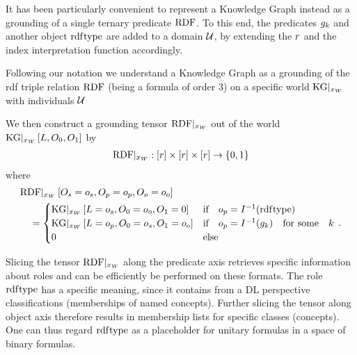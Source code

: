 \label{subsec:knowledgeGraphTernaryRep}

It has been particularly convenient to represent a Knowledge Graph instead as a grounding of a single ternary predicate $\mathrm{RDF}$.
To this end, the predicates $g_{k}$ and another object $\mathrm{rdf}\mathrm{type}$ are added to a domain $\mathcal{U}$, by extending the $r$ and the index interpretation function accordingly.


Following our notation we understand a Knowledge Graph as a grounding of the rdf triple relation $\mathrm{RDF}$ (being a formula of order 3) on a specific world $\mathrm{KG}|_{x_{W}}$ with individuals $\mathcal{U}$

We then construct a grounding tensor ${\mathrm{RDF}}|_{x_{W}}$ out of the world $\mathrm{KG}|_{x_{W}}\left[L,O_{0},O_{1}\right]$ by
\begin{align*}
    {\mathrm{RDF}}|_{x_{W}} : [r] \times [r] \times [r] \rightarrow \{0,1\}
\end{align*}
where
\begin{align*}
    &{\mathrm{RDF}}|_{x_{W}}\left[O_{s}=o_{s}, O_{p}=o_{p}, O_{o}=o_{o}\right] \\
    &\quad =
    \begin{cases}
        \mathrm{KG}|_{x_{W}}\left[L=o_{s},O_{0}=o_{o},O_{1}=0\right]
        & \text{if}\quad o_{p} = I^{-1}(\mathrm{rdf}\mathrm{type}) \\
        \mathrm{KG}|_{x_{W}}\left[L=o_{p},O_{0}=o_{s},O_{1}=o_{o}\right]
        & \text{if}\quad o_{p} = I^{-1}(g_{k}) \quad \text{for some} \quad k \\
        0  \quad & \text{else}
    \end{cases} \, .
\end{align*}


Slicing the tensor ${\mathrm{RDF}}|_{x_{W}}$ along the predicate axis retrieves specific information about roles and can be efficiently be performed on these formats.
The role $\mathrm{rdf}\mathrm{type}$ has a specific meaning, since it contains from a DL perspective classifications (memberships of named concepts).
Further slicing the tensor along object axis therefore results in membership lists for specific classes (concepts).
One can thus regard $\mathrm{rdf}\mathrm{type}$ as a placeholder for unitary formulas in a space of binary formulas.

